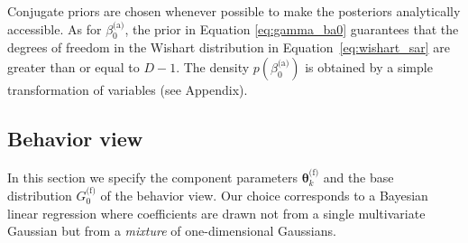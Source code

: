 \documentclass[smallextended]{svjour3}          %
\newcommand{\betaoa}{\beta_{0}^\text{(a)}}
\begin{document}
Conjugate priors are chosen whenever possible to make the posteriors analytically accessible. As for $\betaoa$, the prior in Equation \ref{eq:gamma_ba0} guarantees that the degrees of freedom in the Wishart distribution in Equation~\ref{eq:wishart_sar} are greater than or equal to $D-1$. The density $p(\betaoa)$ is obtained by a simple transformation of variables (see Appendix).

\subsection{Behavior view}\label{sec:forums_behaviors}
In this section we specify the component parameters $\boldsymbol{\theta}_k^{\text{(f)}}$ and the base distribution $G_0^{\text{(f)}}$ of the behavior view. Our choice corresponds to a Bayesian linear regression where coefficients are drawn not from a single multivariate Gaussian but from a \emph{mixture} of one-dimensional Gaussians.
\end{document}
